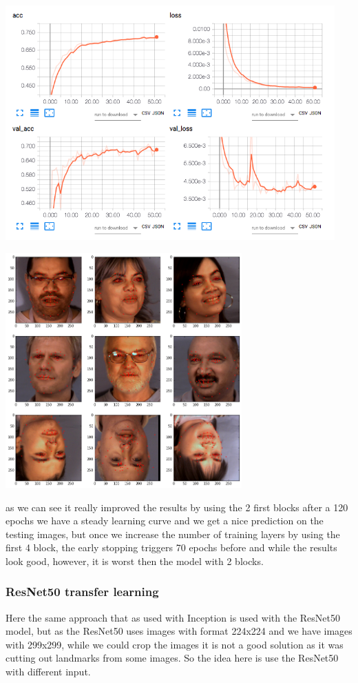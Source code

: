 \documentclass[11pt]{article}
\begin{document}
\begin{enumerate}
\begin{enumerate}
\centerline{\includegraphics[height=9cm]{./images/incep197Loss.png}}
\centerline{\includegraphics[height=9cm]{./images/incep197res.png}}


\pagebreak
as we can see it really improved the results by using the 2 first blocks after a
120 epochs we have a steady learning curve and we get a nice prediction on the
testing images, but once we increase the number of training layers by using
the first 4 block, the early stopping triggers 70 epochs before and while
the results look good, however, it is worst then the model with 2 blocks.
\end{enumerate}
\end{enumerate}


\subsubsection{ResNet50 transfer learning}
\label{sec:org12be8db}
Here the same approach that as used with Inception is used with the ResNet50 \cite{he2016deep}  
model, but as the ResNet50 uses images with format 224x224 and we have images
with 299x299, while we could crop the images it is not a good solution as it
was cutting out landmarks from some images. So the idea here is use the
ResNet50 with different input. 
\end{document}

